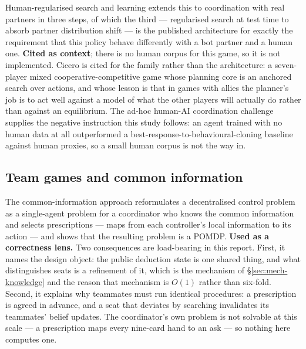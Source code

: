Human-regularised search and learning \cite{hu2022humanregularized} extends this
to coordination with real partners in three steps, of which the third ---
regularised search at test time to absorb partner distribution shift --- is the
published architecture for exactly the requirement that this policy behave
differently with a bot partner and a human one. \textbf{Cited as context};
there is no human corpus for this game, so it is not implemented. Cicero
\cite{fair2022cicero} is cited for the family rather than the architecture: a
seven-player mixed cooperative-competitive game whose planning core is an
anchored search over actions, and whose lesson is that in games with allies the
planner's job is to act well against a model of what the other players will
actually do rather than against an equilibrium. The ad-hoc human-AI coordination
challenge \cite{dizdarevic2025ah2ac2} supplies the negative instruction this
study follows: an agent trained with no human data at all outperformed a
best-response-to-behavioural-cloning baseline against human proxies, so a small
human corpus is not the way in.

\subsection{Team games and common information}
\label{app:rel-team}

The common-information approach \cite{nayyar2013common} reformulates a
decentralised control problem as a single-agent problem for a coordinator who
knows the common information and selects prescriptions --- maps from each
controller's local information to its action --- and shows that the resulting
problem is a POMDP. \textbf{Used as a correctness lens.} Two consequences are
load-bearing in this report. First, it names the design object: the public
deduction state is one shared thing, and what distinguishes seats is a
refinement of it, which is the mechanism of \S\ref{sec:mech-knowledge} and the
reason that mechanism is $O(1)$ rather than six-fold. Second, it explains why
teammates must run identical procedures: a prescription is agreed in advance,
and a seat that deviates by searching invalidates its teammates' belief updates.
The coordinator's own problem is not solvable at this scale --- a prescription
maps every nine-card hand to an ask --- so nothing here computes one.

